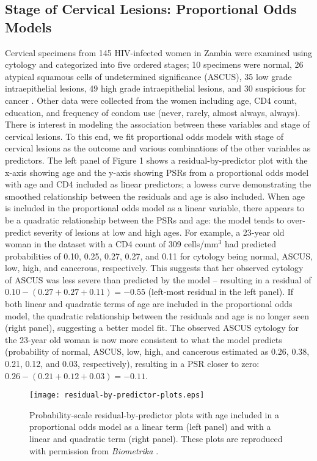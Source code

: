\documentclass[12pt, usenatbib]{article}
\begin{document}
\subsection{Stage of Cervical Lesions: Proportional Odds Models}

Cervical specimens from 145 HIV-infected women in Zambia were examined using cytology and categorized into five ordered stages; 10 specimens were normal,  26 atypical squamous cells of undetermined significance (ASCUS), 35 low grade intraepithelial lesions, 49 high grade intraepithelial lesions, and 30 suspicious for cancer \citep{parham2006}.  Other data were collected from the women including age, CD4 count, education, and frequency of condom use (never, rarely, almost always, always). There is interest in modeling the association between these variables and stage of cervical lesions.  To this end, we fit proportional odds models with stage of cervical lesions as the outcome and various combinations of the other variables as predictors.  The left panel of Figure 1 shows a residual-by-predictor plot with the x-axis showing age and the y-axis showing PSRs from a proportional odds model with age and CD4 included as linear predictors; a lowess curve demonstrating the smoothed relationship between the residuals and age is also included.  When age is included in the proportional odds model as a linear variable,  there appears to be a quadratic relationship between the PSRs and age:  the model tends to over-predict severity of lesions at low and high ages. For example, a 23-year old woman in the dataset with a CD4 count of 309 cells/mm$^3$ had predicted probabilities of 0.10, 0.25, 0.27, 0.27, and 0.11 for cytology being normal, ASCUS, low, high, and cancerous, respectively.  This suggests that her observed cytology of ASCUS was less severe than predicted by the model -- resulting in a residual of $0.10-(0.27+0.27+0.11)=-0.55$ (left-most residual in the left panel).  If both linear and quadratic terms of age are included in the proportional odds model, the quadratic relationship between the residuals and age is no longer seen (right panel), suggesting a better model fit.  The observed ASCUS cytology for the 23-year old woman is now more consistent to what the model predicts (probability of normal, ASCUS, low, high, and cancerous estimated as 0.26, 0.38, 0.21, 0.12, and 0.03, respectively), resulting in a PSR closer to zero: $0.26-(0.21+0.12+0.03)=-0.11$. 


\begin{figure}
\begin{center}
\texttt{[image: residual-by-predictor-plots.eps]}
\end{center}
\caption{Probability-scale residual-by-predictor plots with age included in a proportional odds model as a linear term (left panel) and with a linear and quadratic term (right panel).  These plots are reproduced with permission from {\it Biometrika} \citep{li2012new}.}
\label{fig1}
\end{figure}  
\end{document}
